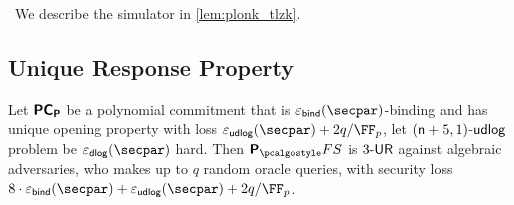 \ 
We describe the simulator in \cref{lem:plonk_tlzk}.

\subsection{Unique Response Property}
\begin{lemma}
	\label{lem:plonkprot_ur}
	Let $\bm{\mathsf{PC}}_{\bm{\mathsf{P}}}$ be a polynomial commitment that is $\epsbind(\secpar)$-binding and has unique opening property with loss $\epsudlog (\secpar) + 2 \infrac{q}{\FF_p}$, let $(\mathsf{n} + 5, 1)$-$\mathsf{udlog}$ problem be $\epsdlog (\secpar)$ hard. Then $\plonkprotfs$ is ${3\text{-}\mathsf{UR}}$ against algebraic adversaries, who makes up to $q$ random oracle queries, with security loss $8  \cdot \epsbinding (\secpar) + \epsudlog (\secpar) + 2 \infrac{q}{\FF_p}$.
\end{lemma}
